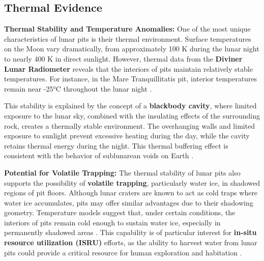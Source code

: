 \subsection{Thermal Evidence}

\textbf{Thermal Stability and Temperature Anomalies:} One of the most unique characteristics of lunar pits is their thermal environment. Surface temperatures on the Moon vary dramatically, from approximately 100 K during the lunar night to nearly 400 K in direct sunlight. However, thermal data from the \textbf{Diviner Lunar Radiometer} reveals that the interiors of pits maintain relatively stable temperatures. For instance, in the Mare Tranquillitatis pit, interior temperatures remain near -25°C throughout the lunar night \citep{thermal-lunar-pits}. 

This stability is explained by the concept of a \textbf{blackbody cavity}, where limited exposure to the lunar sky, combined with the insulating effects of the surrounding rock, creates a thermally stable environment. The overhanging walls and limited exposure to sunlight prevent excessive heating during the day, while the cavity retains thermal energy during the night. This thermal buffering effect is consistent with the behavior of sublunarean voids on Earth \citep{thermal-lunar-pits, newer-thermal}. 

\textbf{Potential for Volatile Trapping:} The thermal stability of lunar pits also supports the possibility of \textbf{volatile trapping}, particularly water ice, in shadowed regions of pit floors. Although lunar craters are known to act as cold traps where water ice accumulates, pits may offer similar advantages due to their shadowing geometry. Temperature models suggest that, under certain conditions, the interiors of pits remain cold enough to sustain water ice, especially in permanently shadowed areas \citep{newer-thermal, lunar-pits-numerical-modelling}. This capability is of particular interest for \textbf{in-situ resource utilization (ISRU)} efforts, as the ability to harvest water from lunar pits could provide a critical resource for human exploration and habitation \citep{newer-thermal}.

